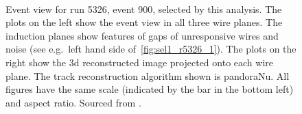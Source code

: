 \begin{figure}[htbp]
\begin{adjustwidth}{-1cm}{-1cm}
 \\  
\caption[Event View for Run 5326, Event 900]{Event view for run 5326, event 900, selected by this analysis. The plots on the left show the event view in all three wire planes. The induction planes show features of gaps of unresponsive wires and noise (see e.g.~left hand side of~\ref{fig:sel1_r5326_1}). The plots on the right show the \gls{3d} reconstructed image projected onto each wire plane. The track reconstruction algorithm shown is pandoraNu. All figures have the same scale (indicated by the bar in the bottom left) and aspect ratio. Sourced from \cite{MicroBooNECCInclPN}.}
\label{fig:sel1_r5326}
\end{adjustwidth}
\end{figure}

